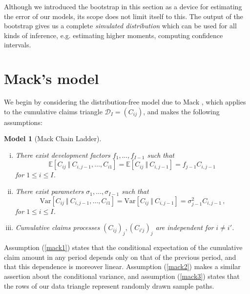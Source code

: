 \documentclass[a4paper]{book}
\theoremstyle{plain}
\newtheorem{model}{Model}
\begin{document}
Although we introduced the bootstrap in this section as a device for estimating the error of our models, its scope does not limit itself to this. The output of the bootstrap gives us a complete \emph{simulated distribution} which can be used for all kinds of inference, e.g. estimating higher moments, computing confidence intervals. 

\section{Mack's model}

We begin by considering the distribution-free model due to Mack , which applies to the cumulative claims triangle $\mathcal{D}_I = (C_{ij})$, and makes the following assumptions:
\begin{model}[Mack Chain Ladder] \label{mack} \leavevmode
    \begin{enumerate}[(i)]
        \item \label{mack1} There exist development factors $f_1, \dots, f_{I - 1}$ such that
        \begin{displaymath}
            \mathbb{E}[C_{ij} \ \Vert \ C_{i, j - 1}, \dots, C_{i1}] = \mathbb{E}[C_{ij} \ \Vert \ C_{i, j - 1}] = f_{j - 1} C_{i, j - 1}\,
        \end{displaymath}
        for $1 \leq i \leq I$.
        \item \label{mack2} There exist parameters $\sigma_1, \dots, \sigma_{I - 1}$ such that
        \begin{displaymath}
            \mathrm{Var}[C_{ij} \ \Vert \ C_{i, j - 1}, \dots, C_{i1}] = \mathrm{Var}[C_{ij} \ \Vert \ C_{i, j - 1}] = \sigma_{j - 1}^2 C_{i, j - 1}\,,
        \end{displaymath}
        for $1 \leq i \leq I$.
        \item \label{mack3} Cumulative claims processes $(C_{ij})_j, (C_{i'j})_j$ are independent for $i \neq i'$.
    \end{enumerate}
\end{model}
Assumption (\ref{mack1}) states that the conditional expectation of the cumulative claim amount in any period depends only on that of the previous period, and that this dependence is moreover linear. Assumption (\ref{mack2}) makes a similar assertion about the conditional variance, and assumption (\ref{mack3}) states that the rows of our data triangle represent randomly drawn sample paths.
\end{document}
